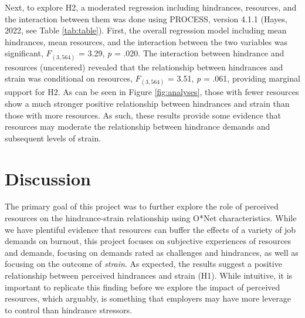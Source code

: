 \documentclass[
  english,
  man]{apa6}
\begin{document}
Next, to explore H2, a moderated regression including hindrances, resources, and the interaction between them was done using PROCESS, version 4.1.1 (Hayes, 2022, see Table \ref{tab:table}). First, the overall regression model including mean hindrances, mean resources, and the interaction between the two variables was significant, \(F_{(3, 564)}\) = 3.29, \emph{p} = .020. The interaction between hindrance and resources (uncentered) revealed that the relationship between hindrances and strain was conditional on resources, \(F_{(3, 564)}\) = 3.51, \emph{p} = .061, providing marginal support for H2. As can be seen in Figure \ref{fig:analyses}, those with fewer resources show a much stronger positive relationship between hindrances and strain than those with more resources. As such, these results provide some evidence that resources may moderate the relationship between hindrance demands and subsequent levels of strain.

\hypertarget{discussion}{%
\section{Discussion}\label{discussion}}

The primary goal of this project was to further explore the role of perceived resources on the hindrance-strain relationship using O*Net characteristics. While we have plentiful evidence that resources can buffer the effects of a variety of job demands on burnout, this project focuses on subjective experiences of resources and demands, focusing on demands rated as challenges and hindrances, as well as focusing on the outcome of \emph{strain}. As expected, the results suggest a positive relationship between perceived hindrances and strain (H1). While intuitive, it is important to replicate this finding before we explore the impact of perceived resources, which arguably, is something that employers may have more leverage to control than hindrance stressors.
\end{document}
